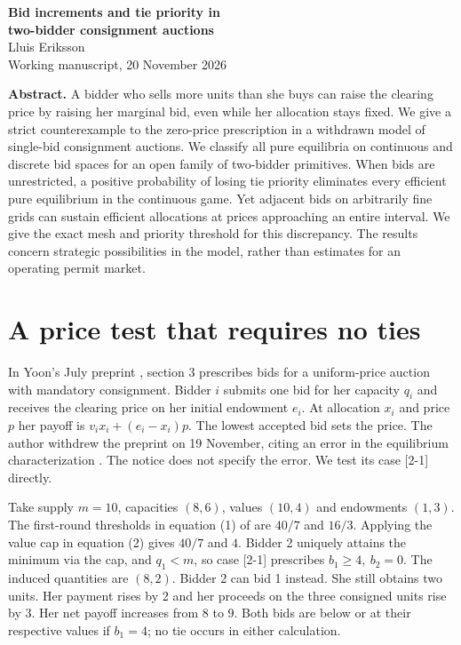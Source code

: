 \documentclass[11pt]{article}
\begin{document}
\begin{center}{\LARGE\bfseries Bid increments and tie priority in\\[3pt] two-bidder consignment auctions}\\[8pt]
Lluis Eriksson\\[2pt]\small Working manuscript, 20 November 2026
\end{center}
\textbf{Abstract.} A bidder who sells more units than she buys can raise the clearing price by raising her marginal bid, even while her allocation stays fixed. We give a strict counterexample to the zero-price prescription in a withdrawn model of single-bid consignment auctions. We classify all pure equilibria on continuous and discrete bid spaces for an open family of two-bidder primitives. When bids are unrestricted, a positive probability of losing tie priority eliminates every efficient pure equilibrium in the continuous game. Yet adjacent bids on arbitrarily fine grids can sustain efficient allocations at prices approaching an entire interval. We give the exact mesh and priority threshold for this discrepancy. The results concern strategic possibilities in the model, rather than estimates for an operating permit market.

\section{A price test that requires no ties}
In Yoon's July preprint \cite{yoon}, section 3 prescribes bids for a uniform-price auction with mandatory consignment. Bidder $i$ submits one bid for her capacity $q_i$ and receives the clearing price on her initial endowment $e_i$. At allocation $x_i$ and price $p$ her payoff is $v_i x_i+(e_i-x_i)p$. The lowest accepted bid sets the price. The author withdrew the preprint on 19 November, citing an error in the equilibrium characterization \cite{withdrawal}. The notice does not specify the error. We test its case [2-1] directly.

Take supply $m=10$, capacities $(8,6)$, values $(10,4)$ and endowments $(1,3)$. The first-round thresholds in equation (1) of \cite{yoon} are $40/7$ and $16/3$. Applying the value cap in equation (2) gives $40/7$ and $4$. Bidder 2 uniquely attains the minimum via the cap, and $q_1<m$, so case [2-1] prescribes $b_1\ge4,\ b_2=0$. The induced quantities are $(8,2)$. Bidder 2 can bid 1 instead. She still obtains two units. Her payment rises by 2 and her proceeds on the three consigned units rise by 3. Her net payoff increases from 8 to 9. Both bids are below or at their respective values if $b_1=4$; no tie occurs in either calculation.
\end{document}
